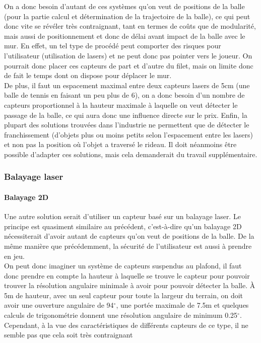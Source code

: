 On a donc besoin d'autant de ces systèmes qu'on veut de positions de la balle (pour la partie calcul et détermination de la trajectoire de la balle), ce qui peut donc vite se révéler très contraignant, tant en termes de coûts que de modularité, mais aussi de positionnement et donc de délai avant impact de la balle avec le mur. En effet, un tel type de procédé peut comporter des risques pour l'utilisateur (utilisation de lasers) et ne peut donc pas pointer vers le joueur. On pourrait donc placer ces capteurs de part et d'autre du filet, mais on limite donc de fait le temps dont on dispose pour déplacer le mur. \\

De plus, il faut un espacement maximal entre deux capteurs lasers de 5cm (une balle de tennis en faisant un peu plus de 6), on a donc besoin d'un nombre de capteurs proportionnel à la hauteur maximale à laquelle on veut détecter le passage de la balle, ce qui aura donc une influence directe sur le prix. Enfin, la plupart des solutions trouvées dans l'industrie ne permettent que de détecter le franchissement (d'objets plus ou moins petits selon l'espacement entre les lasers) et non pas la position où l'objet a traversé le rideau. Il doit néanmoins être possible d'adapter ces solutions, mais cela demanderait du travail supplémentaire. 


\subsubsection{Balayage laser}

\paragraph{Balayage 2D\\}

Une autre solution serait d'utiliser un capteur basé sur un balayage laser. Le principe est quasiment similaire au précédent, c'est-à-dire qu'un balayage 2D nécessiterait d'avoir autant de capteurs qu'on veut de positions de la balle. De la même manière que précédemment, la sécurité de l'utilisateur est aussi à prendre en jeu. \\

On peut donc imaginer un système de capteurs suspendus au plafond, il faut donc prendre en compte la hauteur à laquelle se trouve le capteur pour pouvoir trouver la résolution angulaire minimale à avoir pour pouvoir détecter la balle. À 5m de hauteur, avec un seul capteur pour toute la largeur du terrain, on doit avoir une ouverture angulaire de 94$^{\circ}$, une portée maximale de 7.5m et quelques calculs de trigonométrie donnent une résolution angulaire de minimum 0.25$^{\circ}$. Cependant, à la vue des caractéristiques de différents capteurs de ce type, il ne semble pas que cela soit très contraignant \\ 

